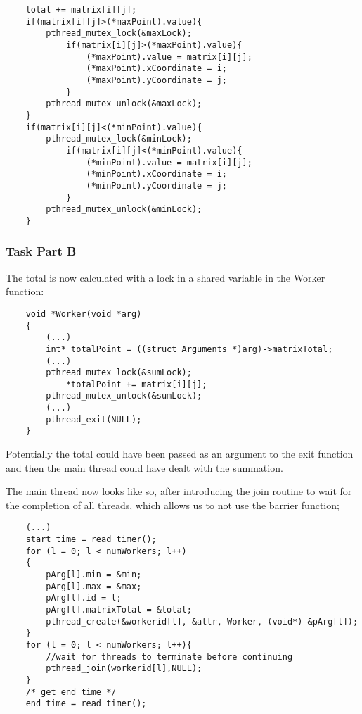 \documentclass[a4paper,11pt]{article}
\begin{document}
\begin{verbatim}
    total += matrix[i][j];
    if(matrix[i][j]>(*maxPoint).value){
        pthread_mutex_lock(&maxLock);
            if(matrix[i][j]>(*maxPoint).value){
                (*maxPoint).value = matrix[i][j];
                (*maxPoint).xCoordinate = i;
                (*maxPoint).yCoordinate = j;
            }
        pthread_mutex_unlock(&maxLock);
    }
    if(matrix[i][j]<(*minPoint).value){
        pthread_mutex_lock(&minLock);
            if(matrix[i][j]<(*minPoint).value){
                (*minPoint).value = matrix[i][j];
                (*minPoint).xCoordinate = i;
                (*minPoint).yCoordinate = j;
            }
        pthread_mutex_unlock(&minLock);
    }
\end{verbatim}

\subsubsection*{Task Part B}

The total is now calculated with a lock in a shared variable in the Worker function:
\begin{verbatim}
    void *Worker(void *arg)
    {
        (...)
        int* totalPoint = ((struct Arguments *)arg)->matrixTotal;
        (...)
        pthread_mutex_lock(&sumLock);
            *totalPoint += matrix[i][j];
        pthread_mutex_unlock(&sumLock);
        (...)
        pthread_exit(NULL);
    }

\end{verbatim}

Potentially the total could have been passed as an argument to the exit function and then the main thread could have dealt with the summation.

The main thread now looks like so, after introducing the join routine to wait for the completion of all threads, which allows us to not use the barrier function;

\begin{verbatim}
    (...)
    start_time = read_timer();
    for (l = 0; l < numWorkers; l++)
	{
        pArg[l].min = &min;
        pArg[l].max = &max;
        pArg[l].id = l;
        pArg[l].matrixTotal = &total;
		pthread_create(&workerid[l], &attr, Worker, (void*) &pArg[l]);
    }
    for (l = 0; l < numWorkers; l++){
        //wait for threads to terminate before continuing 
        pthread_join(workerid[l],NULL);
    }
    /* get end time */
    end_time = read_timer();
\end{verbatim}
\end{document}
